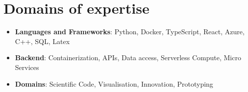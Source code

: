 \documentclass[]{friggeri-cv}
\begin{document}
\section{Domains of expertise}
\begin{itemize} 
	\item {\large\textbf{\textcolor{pblue}{Languages and Frameworks}}}: Python, Docker, TypeScript, React, Azure, C++, SQL, Latex
	\item {\large\textbf{\textcolor{pblue}{Backend}}}: Containerization, APIs, Data access, Serverless Compute, Micro Services
	\item {\large\textbf{\textcolor{pblue}{Domains}}}: Scientific Code, Visualisation, Innovation, Prototyping
\end{itemize}

\vspace*{\fill}
\end{document}
